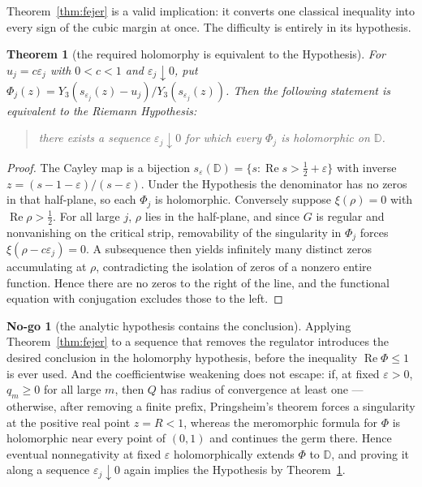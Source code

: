 \documentclass[11pt]{amsart}
\newtheorem{theorem}{Theorem}[section]
\theoremstyle{definition}
\theoremstyle{remark}
\theoremstyle{definition}
\newtheorem{nogo}{No-go}[section]
\renewcommand{\Re}{\operatorname{Re}}
\newcommand{\half}{\tfrac{1}{2}}
\newcommand{\eps}{\varepsilon}
\newcommand{\Dd}{\mathbb{D}}
\begin{document}
Theorem~\ref{thm:fejer} is a valid implication: it converts one classical inequality into every
sign of the cubic margin at once. The difficulty is entirely in its hypothesis.

\begin{theorem}[the required holomorphy is equivalent to the Hypothesis]
\label{thm:fejer-rh}
For $u_j=c\eps_j$ with $0<c<1$ and $\eps_j\downarrow0$, put
$\Phi_j(z)=Y_3(s_{\eps_j}(z)-u_j)/Y_3(s_{\eps_j}(z))$. Then the following statement is equivalent
to the Riemann Hypothesis:
\begin{quote}
there exists a sequence $\eps_j\downarrow0$ for which every $\Phi_j$ is holomorphic on $\Dd$.
\end{quote}
\end{theorem}

\begin{proof}
The Cayley map is a bijection
$s_\eps(\Dd)=\{s:\Re s>\half+\eps\}$ with inverse $z=(s-1-\eps)/(s-\eps)$. Under the Hypothesis
the denominator has no zeros in that half-plane, so each $\Phi_j$ is holomorphic. Conversely
suppose $\xi(\rho)=0$ with $\Re\rho>\half$. For all large $j$, $\rho$ lies in the half-plane, and
since $G$ is regular and nonvanishing on the critical strip, removability of the singularity in
$\Phi_j$ forces $\xi(\rho-c\eps_j)=0$. A subsequence then yields infinitely many distinct zeros
accumulating at $\rho$, contradicting the isolation of zeros of a nonzero entire function. Hence
there are no zeros to the right of the line, and the functional equation with conjugation
excludes those to the left.
\end{proof}

\begin{nogo}[the analytic hypothesis contains the conclusion]\label{ng:fejer}
Applying Theorem~\ref{thm:fejer} to a sequence that removes the regulator introduces the desired
conclusion in the holomorphy hypothesis, before the inequality $\Re\Phi\le1$ is ever used. And the
coefficientwise weakening does not escape: if, at fixed $\eps>0$, $q_m\ge0$ for all large $m$,
then $Q$ has radius of convergence at least one --- otherwise, after removing a finite prefix,
Pringsheim's theorem forces a singularity at the positive real point $z=R<1$, whereas the
meromorphic formula for $\Phi$ is holomorphic near every point of $(0,1)$ and continues the germ
there. Hence eventual nonnegativity at fixed $\eps$ holomorphically extends $\Phi$ to $\Dd$, and
proving it along a sequence $\eps_j\downarrow0$ again implies the Hypothesis by
Theorem~\ref{thm:fejer-rh}.
\end{nogo}
\end{document}
